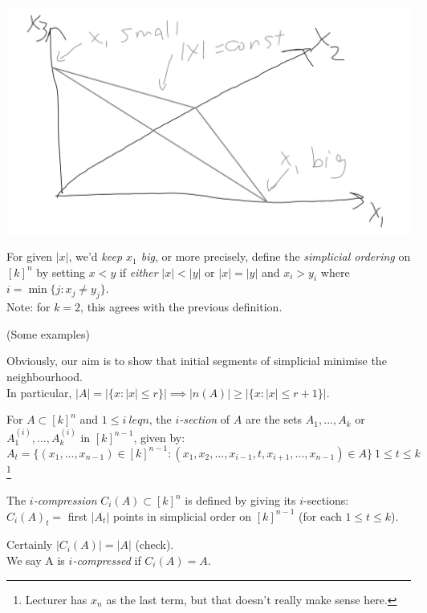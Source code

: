 \documentclass[a4paper]{article}
\begin{document}
\includegraphics[scale=0.5]{image/Comb_04.png}

For given $|x|$, we'd \emph{keep $x_1$ big}, or more precisely, define the \emph{simplicial ordering} on $[k]^n$ by setting $x<y$ if \emph{either} $|x| < |y|$ or $|x| = |y|$ and $x_i > y_i$ where $i = \min\{j:x_j \neq y_j\}$.\\
Note: for $k=2$, this agrees with the previous definition.

(Some examples)

Obviously, our aim is to show that initial segments of simplicial minimise the neighbourhood.\\
In particular, $|A| = |\{x:|x| \leq r\}| \implies |n(A)| \geq |\{x:|x|\leq r+1\}|$.

For $A \subset [k]^n$ and $1 \leq i\ leq n$, the \emph{$i$-section} of $A$ are the sets $A_1,...,A_k$ or $A_1^{(i)},...,A_k^{(i)}$ in $[k]^{n-1}$, given by:\\
$$A_t = \{(x_1,...,x_{n-1}) \in [k]^{n-1}: (x_1,x_2,...,x_{i-1},t,x_{i+1},...,x_{n-1}) \in  A\}\ 1 \leq t \leq k$$\footnote{Lecturer has $x_n$ as the last term, but that doesn't really make sense here.}

The \emph{$i$-compression} $C_i(A) \subset [k]^n$ is defined by giving its $i$-sections:\\
$C_i(A)_t =$ first $|A_t|$ points in simplicial order on $[k]^{n-1}$ (for each $1 \leq t \leq k$).

Certainly $|C_i(A)| = |A|$ (check).\\
We say A is \emph{$i$-compressed} if $C_i(A) = A$.
\end{document}
